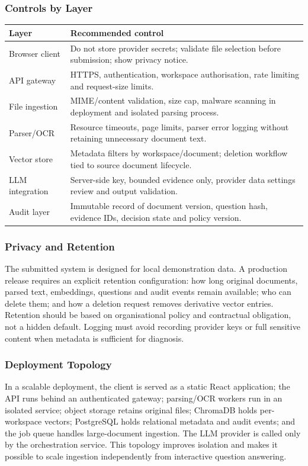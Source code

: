 \documentclass[12pt,a4paper,oneside]{report}
\begin{document}
\subsubsection{Controls by Layer}
\begin{longtable}{p{}p{}}
\toprule
\textbf{Layer} & \textbf{Recommended control}\\
\midrule
Browser client & Do not store provider secrets; validate file selection before submission; show privacy notice.\\
API gateway & HTTPS, authentication, workspace authorisation, rate limiting and request-size limits.\\
File ingestion & MIME/content validation, size cap, malware scanning in deployment and isolated parsing process.\\
Parser/OCR & Resource timeouts, page limits, parser error logging without retaining unnecessary document text.\\
Vector store & Metadata filters by workspace/document; deletion workflow tied to source document lifecycle.\\
LLM integration & Server-side key, bounded evidence only, provider data settings review and output validation.\\
Audit layer & Immutable record of document version, question hash, evidence IDs, decision state and policy version.\\
\bottomrule
\end{longtable}

\subsubsection{Privacy and Retention}
The submitted system is designed for local demonstration data. A production release requires an explicit retention configuration: how long original documents, parsed text, embeddings, questions and audit events remain available; who can delete them; and how a deletion request removes derivative vector entries. Retention should be based on organisational policy and contractual obligation, not a hidden default. Logging must avoid recording provider keys or full sensitive content when metadata is sufficient for diagnosis.

\subsubsection{Deployment Topology}
In a scalable deployment, the client is served as a static React application; the API runs behind an authenticated gateway; parsing/OCR workers run in an isolated service; object storage retains original files; ChromaDB holds per-workspace vectors; PostgreSQL holds relational metadata and audit events; and the job queue handles large-document ingestion. The LLM provider is called only by the orchestration service. This topology improves isolation and makes it possible to scale ingestion independently from interactive question answering.
\end{document}

